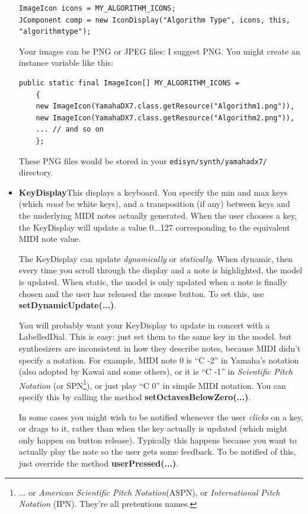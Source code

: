 \documentclass{article}
\begin{document}
\begin{itemize}
\begin{verbatim}
ImageIcon icons = MY_ALGORITHM_ICONS;
JComponent comp = new IconDisplay("Algorithm Type", icons, this, "algorithmtype");
\end{verbatim}

Your images can be PNG or JPEG files: I suggest PNG.  You might create an instance variable like this:

\begin{verbatim}
public static final ImageIcon[] MY_ALGORITHM_ICONS = 
    {
    new ImageIcon(YamahaDX7.class.getResource("Algorithm1.png")),
    new ImageIcon(YamahaDX7.class.getResource("Algorithm2.png")),
    ... // and so on
    };
\end{verbatim}

These PNG files would be stored in your {\tt edisyn/synth/yamahadx7/} directory.


\item {\bf KeyDisplay}\quad This displays a keyboard.  You specify the min and max keys (which {\it must} be white keys), and a transposition (if any) between keys and the underlying MIDI notes actually generated.  When the user chooses a key, the KeyDisplay will update a value 0...127 corresponding to the equivalent MIDI note value.

The KeyDisplay can update {\it dynamically} or {\it statically}.  When dynamic, then every time you scroll through the display and a note is highlighted, the model is updated.  When static, the model is only updated when a note is finally chosen and the user has released the mouse button.  To set this, use {\bf setDynamicUpdate(...)}.  

You will probably want your KeyDisplay to update in concert with a LabelledDial.  This is easy: just set them to the same key in the model.  but synthesizers are inconsistent in how they describe notes, because MIDI didn't specify a notation.  For example, MIDI note 0 is ``C -2'' in Yamaha's notation (also adopted by Kawai and some others), or it is ``C -1'' in {\it Scientific Pitch Notation} (or SPN\footnote{... or {\it American Scientific Pitch Notation}(ASPN), or {\it International Pitch Notation} (IPN).  They're all pretentious names.}), or just play ``C 0'' in simple MIDI notation.  You can specify this by calling the method {\bf setOctavesBelowZero(...)}.

In some cases you might wish to be notified whenever the user {\it clicks} on a key, or drags to it, rather than when the key actually is updated (which might only happen on button release).  Typically this happens because you want to actually play the note so the user gets some feedback.  To be notified of this, just override the method {\bf userPressed(...)}.



\end{itemize}
\end{document}
